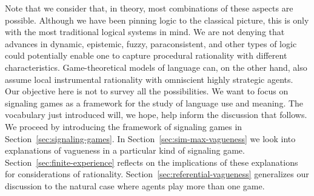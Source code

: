 \documentclass[a4paper]{article}
\begin{document}
Note that we consider that, in theory, most combinations of these aspects are possible.
Although we have been pinning logic to the classical picture, this is only with the most traditional logical systems in mind.
We are not denying that advances in dynamic, epistemic, fuzzy, paraconsistent, and other types of logic could potentially enable one to capture procedural rationality with different characteristics.
Game-theoretical models of language can, on the other hand, also assume local instrumental rationality with omniscient highly strategic agents.
Our objective here is not to survey all the possibilities.
We want to focus on signaling games as a framework for the study of language use and meaning.
The vocabulary just introduced will, we hope, help inform the discussion that follows.
We proceed by introducing the framework of signaling games in Section~\ref{sec:signaling-games}.
In Section~\ref{sec:sim-max-vagueness} we look into explanations of vagueness in a particular kind of signaling game.
Section~\ref{sec:finite-experience} reflects on the implications of these explanations for considerations of rationality.
Section~\ref{sec:referential-vagueness} generalizes our discussion to the natural case where agents play more than one game. 


%
\end{document}
